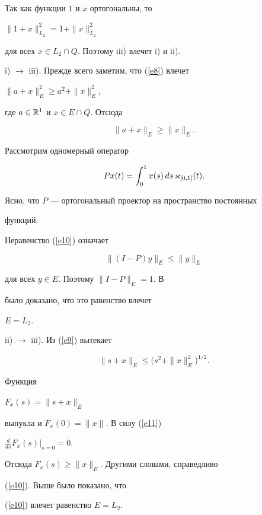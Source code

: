 \begin{pf}


Так как функции $1$ и $x$ ортогональны, то 


$\|1+ x\|_{L_2}^2 = 1 + \|x\|_{L_2}^2$


для всех $x\in L_2 \cap Q$. Поэтому iii) влечет i) и ii). 





i) $\to$ iii). Прежде всего заметим, что (\ref{e8}) влечет


$\|a + x\|_E^2 \ge a^2 + \|x\|_E^2$, 


где $a\in\Bbb R^1$ и $x\in E \cap Q$. Отсюда


\begin{equation}\label{e10}


\|a+x\|_E \ge \|x\|_E. 


\end{equation} 


Рассмотрим одномерный оператор


$$


Px(t) = \intl{0}{1} x(s)\, ds\, \varkappa_{[0,1]} (t). 


$$


Ясно, что $P$ --- ортогональный проектор на пространство постоянных 


функций.


Неравенство (\ref{e10}) означает


$$


\|(I - P)y\|_E \le \|y\|_E


$$


для всех $y\in E$. Поэтому $\|I - P \|_E =1$. В 


\cite{FS} было доказано, что это равенство влечет


$E =L_2$. 





ii) $\to$ iii). Из (\ref{e9}) вытекает


\begin{equation}\label{e11}


\|s + x\|_E \le \big( s^2 + \|x\|_E^2 \big)^{1/2}.


\end{equation} 


Функция 


$F_x (s) = \|s+ x\|_E$


выпукла и $F_x (0) = \|x\|$. В силу (\ref{e11}) 


$\frac {d}{ds} F_x (s)|_{s=0} =0$. 


Отсюда $F_x (s) \ge \|x\|_E$. Другими словами, справедливо 


(\ref{e10}). Выше было показано, что 


(\ref{e10}) влечет равенство $E =L_2$.


\end{pf}






